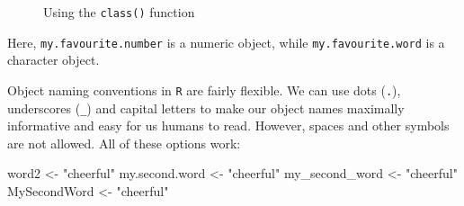 \documentclass[
  letterpaper,
  DIV=11,
  numbers=noendperiod]{scrreprt}
\newenvironment{Shaded}{\begin{snugshade}}{\end{snugshade}}
\newcommand{\NormalTok}[1]{\textcolor[rgb]{0.00,0.23,0.31}{#1}}
\newcommand{\OtherTok}[1]{\textcolor[rgb]{0.00,0.23,0.31}{#1}}
\newcommand{\StringTok}[1]{\textcolor[rgb]{0.13,0.47,0.30}{#1}}
\begin{document}
\begin{figure}


\caption{\label{fig-ShowObjectClass}Using the \texttt{class()} function}

\end{figure}%

Here, \texttt{my.favourite.number} is a numeric object, while
\texttt{my.favourite.word} is a character object.

Object naming conventions in \texttt{R} are fairly flexible. We can use
dots (\texttt{.}), underscores (\texttt{\_}) and capital letters to make
our object names maximally informative and easy for us humans to read.
However, spaces and other symbols are not allowed. All of these options
work:

\begin{Shaded}
\begin{Highlighting}[]
\NormalTok{word2 }\OtherTok{\textless{}{-}} \StringTok{"cheerful"}
\NormalTok{my.second.word }\OtherTok{\textless{}{-}} \StringTok{"cheerful"}
\NormalTok{my\_second\_word }\OtherTok{\textless{}{-}} \StringTok{"cheerful"}
\NormalTok{MySecondWord }\OtherTok{\textless{}{-}} \StringTok{"cheerful"}
\end{Highlighting}
\end{Shaded}
\end{document}
